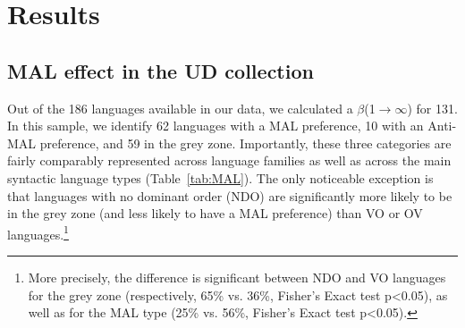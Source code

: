 \section{Results}\label{results}
\subsection{MAL effect in the UD collection}\label{results1}
Out of the 186 languages available in our data, we calculated a $\beta$(1$\rightarrow\infty$) for 131. In this sample, we identify 62 languages with a MAL preference, 10 with an Anti-MAL preference, and 59 in the grey zone. Importantly, these three categories are fairly comparably represented across language families as well as across the main syntactic language types (Table~\ref{tab:MAL}). The only noticeable exception is that languages with no dominant order (NDO) are significantly more likely to be in the grey zone (and less likely to have a MAL preference) than VO or OV languages.\footnote{More precisely, the difference is significant between NDO and VO languages for the grey zone (respectively, 65\%  vs. 36\%, Fisher's Exact test p<0.05), as well as for the MAL type (25\% vs. 56\%, Fisher's Exact test p<0.05).}
 


